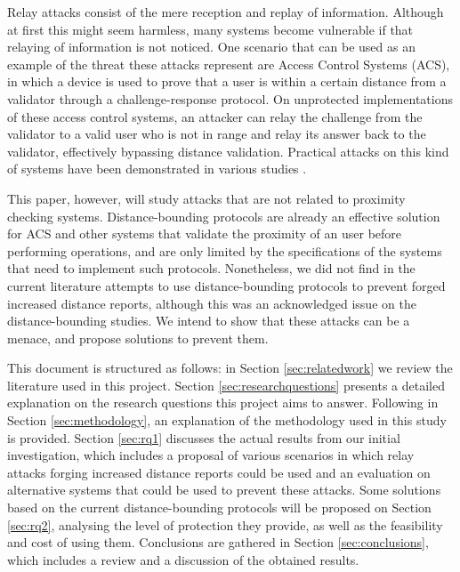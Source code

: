 \documentclass{article}
\begin{document}
Relay attacks consist of the mere reception and replay of information. Although at first this might seem harmless, many systems become vulnerable if that relaying of information is not noticed. One scenario that can be used as an example of the threat these attacks represent are Access Control Systems (ACS), in which a device is used to prove that a user is within a certain distance from a validator through a challenge-response protocol. On unprotected implementations of these access control systems, an attacker can relay the challenge from the validator to a valid user who is not in range and relay its answer back to the validator, effectively bypassing distance validation. Practical attacks on this kind of systems have been demonstrated in various studies \cite{francillon2011relay, francis2010practical, hancke2005practical, markantonakis2012practical}.

This paper, however, will study attacks that are not related to proximity checking systems. Distance-bounding protocols are already an effective solution for ACS and other systems that validate the proximity of an user before performing operations, and are only limited by the specifications of the systems that need to implement such protocols. Nonetheless, we did not find in the current literature attempts to use distance-bounding protocols to prevent forged increased distance reports, although this was an acknowledged issue on the distance-bounding studies. We intend to show that these attacks can be a menace, and propose solutions to prevent them.

This document is structured as follows: in Section \ref{sec:relatedwork} we review the literature used in this project. Section \ref{sec:researchquestions} presents a detailed explanation on the research questions this project aims to answer. Following in Section \ref{sec:methodology}, an explanation of the methodology used in this study is provided. Section \ref{sec:rq1} discusses the actual results from our initial investigation, which includes a proposal of various scenarios in which relay attacks forging increased distance reports could be used and an evaluation on alternative systems that could be used to prevent these attacks. Some solutions based on the current distance-bounding protocols will be proposed on Section \ref{sec:rq2}, analysing the level of protection they provide, as well as the feasibility and cost of using them. Conclusions are gathered in Section \ref{sec:conclusions}, which includes a review and a discussion of the obtained results.
\end{document}
